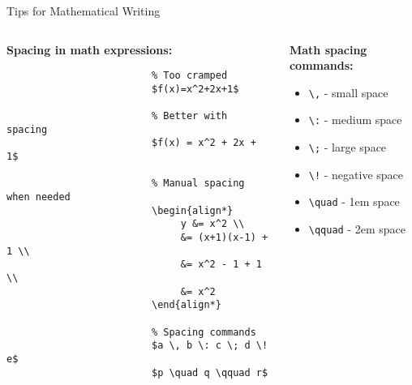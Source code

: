      \begin{frame}[fragile]{Tips for Mathematical Writing}
          \begin{columns}
               \begin{column}{0.5\textwidth}
                    \textbf{Spacing in math expressions:}
                    
                    \begin{lstlisting}
                         % Too cramped
                         $f(x)=x^2+2x+1$
                         
                         % Better with spacing
                         $f(x) = x^2 + 2x + 1$
                         
                         % Manual spacing when needed
                         \begin{align*}
                              y &= x^2 \\
                              &= (x+1)(x-1) + 1 \\
                              &= x^2 - 1 + 1 \\
                              &= x^2
                         \end{align*}
                         
                         % Spacing commands
                         $a \, b \: c \; d \! e$
                         $p \quad q \qquad r$
                    \end{lstlisting}
               \end{column}
               
               \begin{column}{0.5\textwidth}
                    \textbf{Math spacing commands:}
                    \begin{itemize}
                         \item \texttt{\textbackslash,} - small space
                         \item \texttt{\textbackslash:} - medium space
                         \item \texttt{\textbackslash;} - large space
                         \item \texttt{\textbackslash!} - negative space
                         \item \texttt{\textbackslash quad} - 1em space
                         \item \texttt{\textbackslash qquad} - 2em space
                    \end{itemize}
                    

\end{column}
\end{columns}
\end{frame}
